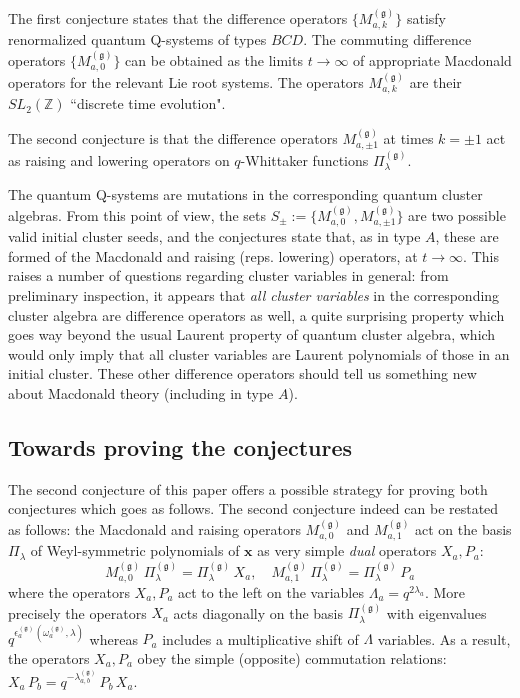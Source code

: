 \documentclass[12pt]{amsart}
\newcommand{\g}{{\mathfrak{g}}}
\newcommand{\Z}{{\mathbb Z}}
\newcommand{\bx}{{\mathbf x}}
\numberwithin{equation}{section}
\numberwithin{table}{section}
\begin{document}
The first conjecture states that the difference operators $\{M_{a,k}^{(\g)}\}$ satisfy  renormalized  quantum Q-systems of types $BCD$. The commuting difference operators $\{M_{a,0}^{(\g)}\}$ can be obtained as the limits $t\to \infty$  of appropriate Macdonald operators for the relevant Lie root systems.  The operators $M_{a,k}^{(\g)}$ are their $SL_2(\Z)$ ``discrete time evolution".

The second conjecture is that the  difference operators $M_{a,\pm 1}^{(\g)}$
at times $k=\pm 1$ act as 
raising and lowering operators on $q$-Whittaker functions  $\Pi_\lambda^{(\g)}$.

The quantum Q-systems are mutations in the corresponding quantum cluster algebras.
From this point of view, the sets $S_{\pm}:=\{ M_{a,0}^{(\g)},M_{a,\pm 1}^{(\g)}\}$
are two possible valid initial cluster seeds, and the conjectures state that, as in type $A$, these are formed
of the Macdonald and raising (reps. lowering) operators, at $t\to \infty$. This raises a number of questions
regarding cluster variables in general: from preliminary inspection, 
it appears that {\it all cluster
variables} in the corresponding cluster algebra are difference operators as well, a quite surprising property
which goes way beyond the usual Laurent property of quantum cluster algebra, which would only imply that
all cluster variables are Laurent polynomials of those in an initial cluster. These other difference operators should tell us something new about Macdonald theory (including in type $A$).


\subsection{Towards proving the conjectures}

The second conjecture of this paper offers a possible strategy for proving both conjectures which goes as follows. The second conjecture indeed can be restated as follows: the Macdonald and raising operators $M_{a,0}^{(\g)}$ and $M_{a,1}^{(\g)}$
act on the basis $\Pi_\lambda$ of Weyl-symmetric polynomials of $\bx$ as very simple {\it dual} 
operators $X_a,P_a$:
$$M_{a,0}^{(\g)}\, \Pi_\lambda^{(\g)}=  \Pi_\lambda^{(\g)} \, X_a,
\quad M_{a,1}^{(\g)}\, \Pi_\lambda^{(\g)}=  \Pi_\lambda^{(\g)} \, P_a $$
where the operators $X_a,P_a$ act to the left on the variables $\Lambda_a=q^{2\lambda_a}$.
More precisely the operators $X_a$ acts diagonally on the basis $\Pi_\lambda^{(\g)}$ with eigenvalues $q^{\epsilon_a^{(\g)}(\omega_a^{(\g)}\!\!,\lambda)}$ whereas $P_a$ includes a 
multiplicative shift of $\Lambda$ variables. As a result, the operators $X_a,P_a$ obey the simple (opposite)  commutation relations:  $X_a \, P_b=q^{-\lambda_{a,b}^{(\g)}}\,P_b\, X_a$.
\end{document}
